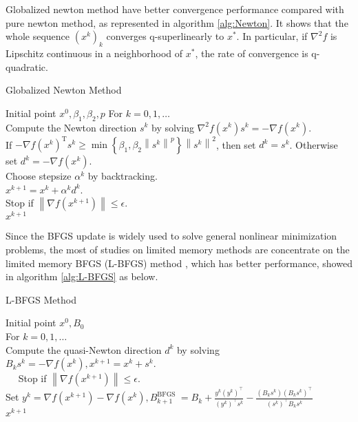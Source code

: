  Globalized newton method have better convergence performance compared with pure newton method, as represented in algorithm \ref{alg:Newton}. It shows that the whole sequence $\left(x^{k}\right)_{k}$ converges q-superlinearly to $x^{*}$. In particular, if $\nabla^{2} f$ is Lipschitz continuous in a neighborhood of $x^{*}$, the rate of convergence is q-quadratic. 
 \begin{algorithm}[H]
   \caption{Globalized Newton Method}
   \label{alg:Newton}
   \begin{algorithmic}[1]
   \REQUIRE
   Initial point $x^{0}, \beta_{1}, \beta_{2}, p$
   \STATE For $k=0,1, \ldots$ \\
   \STATE Compute the Newton direction $s^{k}$ by solving $\nabla^{2} f\left(x^{k}\right) s^{k}=-\nabla f\left(x^{k}\right)$. \\
   \STATE If $-\nabla f\left(x^{k}\right)^{\mathrm{T}} s^{k} \geq \min \left\{\beta_{1}, \beta_{2}\left\|s^{k}\right\|^{p}\right\}\left\|s^{k}\right\|^{2}$, then set $d^{k}=s^{k}$. Otherwise set $d^{k}=-\nabla f\left(x^{k}\right)$. \\
   \STATE Choose stepsize $\alpha^{k}$ by backtracking. \\  
   \STATE $x^{k+1}=x^{k}+\alpha^{k} d^{k}$. \\
   \STATE  Stop if $\left\|\nabla f\left(x^{k+1}\right)\right\| \leq \epsilon$. \\  
   \ENSURE $x^{k+1}$ 
  \end{algorithmic}
  \end{algorithm} 
 
  Since the BFGS update is widely used to solve general nonlinear minimization problems, the most of studies on limited memory methods are concentrate on the limited memory BFGS (L-BFGS) method \cite{zhang1999new}, which has better performance, showed in algorithm \ref{alg:L-BFGS} as below.
 
 \begin{algorithm}[H]
   \caption{L-BFGS Method}
   \label{alg:L-BFGS}
   \begin{algorithmic}[1]
   \REQUIRE
 Initial point $x^{0}, B_{0}$ \\
   \STATE For $k=0,1, \ldots$ \\
   \STATE Compute the quasi-Newton direction $d^{k}$ by solving $B_{k} s^{k}=-\nabla f\left(x^{k}\right), x^{k+1}=x^{k}+s^{k}$. \\
   \STATE $\quad$ Stop if $\left\|\nabla f\left(x^{k+1}\right)\right\| \leq \epsilon$. \\
   \STATE Set $y^{k}=\nabla f\left(x^{k+1}\right)-\nabla f\left(x^{k}\right), B_{k+1}^{\text {BFGS }}=B_{k}+\frac{y^{k}\left(y^{k}\right)^{\top}}{\left(y^{k}\right)^{\top} s^{k}}-\frac{\left(B_{k} s^{k}\right)\left(B_{k} s^{k}\right)^{\top}}{\left(s^{k}\right)^{\top} B_{k} s^{k}}$ \\
   \ENSURE $x^{k+1}$ \\
   \end{algorithmic}
 \end{algorithm}
 
